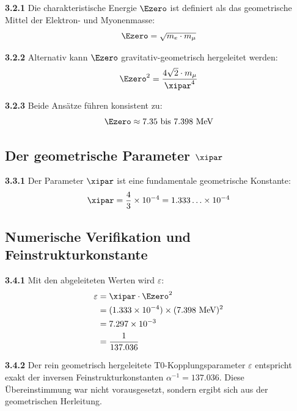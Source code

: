 	\noindent \textbf{3.2.1} Die charakteristische Energie $\Ezero$ ist definiert als das geometrische Mittel der Elektron- und Myonenmasse:
	\begin{equation}
		\Ezero = \sqrt{m_e \cdot m_\mu}
		\label{eq:E0_geometric_mean}
	\end{equation}
	
	\noindent \textbf{3.2.2} Alternativ kann $\Ezero$ gravitativ-geometrisch hergeleitet werden:
	\begin{equation}
		\Ezero^2 = \frac{4\sqrt{2} \cdot m_\mu}{\xipar^4}
		\label{eq:E0_gravitational}
	\end{equation}
	
	\noindent \textbf{3.2.3} Beide Ansätze führen konsistent zu:
	\begin{equation}
		\Ezero \approx 7.35 \text{ bis } 7.398 \text{ MeV}
	\end{equation}
	
	\subsection{Der geometrische Parameter $\xipar$}
	
	\noindent \textbf{3.3.1} Der Parameter $\xipar$ ist eine fundamentale geometrische Konstante:
	\begin{equation}
		\xipar = \frac{4}{3} \times 10^{-4} = 1.333\ldots \times 10^{-4}
		\label{eq:xi_value}
	\end{equation}
	
	\subsection{Numerische Verifikation und Feinstrukturkonstante}
	
	\noindent \textbf{3.4.1} Mit den abgeleiteten Werten wird $\varepsilon$:
	\begin{align}
		\varepsilon &= \xipar \cdot \Ezero^2 \\
		&= (1.333 \times 10^{-4}) \times (7.398 \text{ MeV})^2 \\
		&= 7.297 \times 10^{-3} \\
		&= \frac{1}{137.036}
		\label{eq:epsilon_numerical}
	\end{align}
	
	\begin{tcolorbox}[colback=blue!5!white,colframe=blue!75!black,title=Bemerkenswerte Übereinstimmung]
		\textbf{3.4.2} Der rein geometrisch hergeleitete T0-Kopplungsparameter $\varepsilon$ entspricht exakt der inversen Feinstrukturkonstanten $\alpha^{-1} = 137.036$. Diese Übereinstimmung war nicht vorausgesetzt, sondern ergibt sich aus der geometrischen Herleitung.
	\end{tcolorbox}

